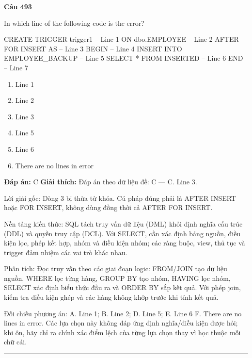 \documentclass[11pt,a4paper]{article}
\newenvironment{question}[1]{%
  \par\vspace{1em}\noindent\textbf{\large Câu #1}\par\vspace{0.4em}
}{%
  \par\vspace{1em}\hrule\vspace{0.6em}
}
\newenvironment{choices}{%
  \begin{enumerate}[label=\textbf{\Alph*.},leftmargin=2.2em,itemsep=2pt,topsep=3pt]
}{%
  \end{enumerate}
}
\newcommand{\choice}{\item}
\newenvironment{codebox}{%
  \begin{tcolorbox}[colback=gray!8!white,colframe=gray!50!black,arc=1.5mm,boxrule=0.6pt,left=3mm,right=3mm,top=2.5mm,bottom=2.5mm]
  \ttfamily\small
}{%
  \end{tcolorbox}
}
\begin{document}
\begin{question}{493}
In which line of the following code is the error?
\begin{codebox}
CREATE TRIGGER trigger1          -- Line 1
ON dbo.EMPLOYEE                  -- Line 2
AFTER FOR INSERT AS              -- Line 3
BEGIN                            -- Line 4
    INSERT INTO EMPLOYEE_BACKUP  -- Line 5
    SELECT * FROM INSERTED       -- Line 6
END                              -- Line 7
\end{codebox}
\begin{choices}
\choice Line 1
\choice Line 2
\choice Line 3
\choice Line 5
\choice Line 6
\choice There are no lines in error
\end{choices}
\textbf{Đáp án:} C
\textbf{Giải thích:} Đáp án theo dữ liệu đề: C — C. Line 3.

Lời giải gốc: Dòng 3 bị thừa từ khóa. Cú pháp đúng phải là AFTER INSERT hoặc FOR INSERT, không dùng đồng thời cả AFTER FOR INSERT.

Nền tảng kiến thức: SQL tách truy vấn dữ liệu (DML) khỏi định nghĩa cấu trúc (DDL) và quyền truy cập (DCL). Với SELECT, cần xác định bảng nguồn, điều kiện lọc, phép kết hợp, nhóm và điều kiện nhóm; các ràng buộc, view, thủ tục và trigger đảm nhiệm các vai trò khác nhau.

Phân tích: Đọc truy vấn theo các giai đoạn logic: FROM/JOIN tạo dữ liệu nguồn, WHERE lọc từng hàng, GROUP BY tạo nhóm, HAVING lọc nhóm, SELECT xác định biểu thức đầu ra và ORDER BY sắp kết quả. Với phép join, kiểm tra điều kiện ghép và các hàng không khớp trước khi tính kết quả.

Đối chiếu phương án: A. Line 1; B. Line 2; D. Line 5; E. Line 6 F. There are no lines in error. Các lựa chọn này không đáp ứng định nghĩa/điều kiện được hỏi; khi ôn, hãy chỉ ra chính xác điểm lệch của từng lựa chọn thay vì học thuộc mỗi chữ cái.
\end{question}
\end{document}
